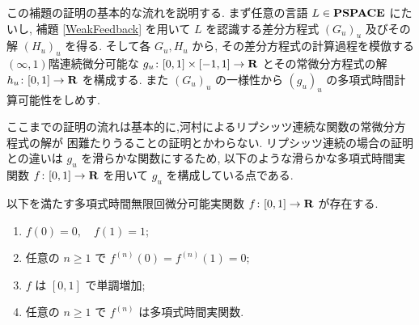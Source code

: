  この補題の証明の基本的な流れを説明する.
 まず任意の言語 $L \in {\bf PSPACE}$ にたいし, 
 補題 \ref{WeakFeedback} を用いて $L$ を認識する差分方程式 $(G_u)_u$ 
 及びその解 $(H_u)_u$ を得る.
 そして各 $G_u, H_u$ から, その差分方程式の計算過程を模倣する
 $(\infty, 1)$階連続微分可能な $g_u \colon [0,1] \times [-1, 1] \to \mathbf R$ 
 とその常微分方程式の解 $h_u \colon [0,1] \to \mathbf R$ を構成する.
 また $(G_u)_u$ の一様性から $(g_u)_u$ の多項式時間計算可能性をしめす.


 ここまでの証明の流れは基本的に,河村によるリプシッツ連続な関数の常微分方程式の解が
 \PSPACE 困難たりうることの証明とかわらない.
 リプシッツ連続の場合の証明との違いは $g_u$ を滑らかな関数にするため, 
 以下のような滑らかな多項式時間実関数 $f \colon [0,1] \to \mathbf R$ を用いて
 $g_u$ を構成している点である.

 \begin{lemma}
  \label{SmoothFunction}
  以下を満たす多項式時間無限回微分可能実関数 $f \colon [0,1] \to \mathbf R$ が存在する.
  \begin{enumerate}
   \item $f(0) = 0, \quad f(1) = 1$;
   \item 任意の $n \ge 1$ で $f^{(n)}(0) = f^{(n)}(1) = 0$;
   \item $f$ は $[0,1]$ で単調増加;
   \item 任意の $n \ge 1$ で $f^{(n)}$ は多項式時間実関数.
  \end{enumerate}
 \end{lemma} 


